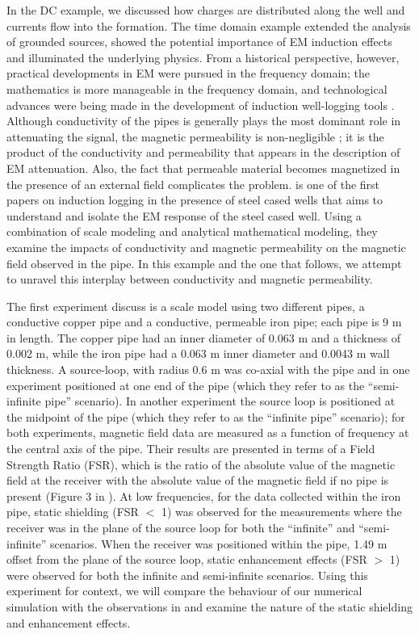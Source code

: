 \documentclass[preprint,review,3p,times,onecolumn,authoryear]{elsarticle}
\begin{document}
In the DC example, we discussed how charges are distributed along the well and currents flow into the formation. The time domain example extended the analysis of grounded sources, showed the potential importance of EM induction effects and illuminated the underlying physics. From a historical perspective, however, practical developments in EM were pursued in the frequency domain; the mathematics is more manageable in the frequency domain, and technological advances were being made in the development of induction well-logging tools \citep{Doll1949, Moran1962}. Although conductivity of the pipes is generally plays the most dominant role in attenuating the signal, the magnetic permeability is non-negligible \citep{Wait1977}; it is the product of the conductivity and permeability that appears in the description of EM attenuation. Also, the fact that permeable material becomes magnetized in the presence of an external field complicates the problem.
\cite{Augustin1989} is one of the first papers on induction logging in the presence of steel cased wells that aims to understand and isolate the EM response of the steel cased well. Using a combination of scale modeling and analytical mathematical modeling, they examine the impacts of conductivity and magnetic permeability on the magnetic field observed in the pipe. In this example and the one that follows, we attempt to unravel this interplay between conductivity and magnetic permeability.

The first experiment \cite{Augustin1989} discuss is a scale model using two different pipes, a conductive copper pipe and a conductive, permeable iron pipe; each pipe is 9 m in length. The copper pipe had an inner diameter of 0.063 m and a thickness of 0.002 m, while the iron pipe had a 0.063 m inner diameter and 0.0043 m wall thickness. A source-loop, with radius 0.6 m was co-axial with the pipe and in one experiment positioned at one end of the pipe (which they refer to as the ``semi-infinite pipe'' scenario). In another experiment the source loop is positioned at the midpoint of the pipe (which they refer to as the ``infinite pipe'' scenario); for both experiments, magnetic field data are measured as a function of frequency at the central axis of the pipe. Their results are presented in terms of a Field Strength Ratio (FSR), which is the ratio of the absolute value of the magnetic field at the receiver with the absolute value of the magnetic field if no pipe is present (Figure 3 in \cite{Augustin1989}). At low frequencies, for the data collected within the iron pipe, static shielding (FSR $<$ 1) was observed for the measurements where the receiver was in the plane of the source loop for both the ``infinite'' and ``semi-infinite'' scenarios. When the receiver was positioned within the pipe, 1.49 m offset from the plane of the source loop, static enhancement effects (FSR $>$ 1) were observed for both the infinite and semi-infinite scenarios. Using this experiment for context, we will compare the behaviour of our numerical simulation with the observations in \citep{Augustin1989} and examine the nature of the static shielding and enhancement effects.
\end{document}

